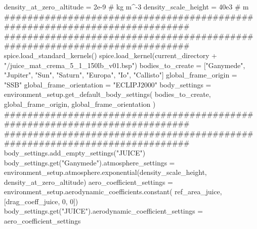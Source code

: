 {}
\markdownRendererSectionEnd \markdownRendererSectionBegin
{}\markdownRendererInterblockSeparator
{}density_at_zero_altitude = 2e-9 # kg m^-3 density_scale_height = 40e3 # m\markdownRendererInterblockSeparator
{}###########################################################################\markdownRendererInterblockSeparator
{}
\markdownRendererSectionEnd \markdownRendererSectionBegin
{}\markdownRendererInterblockSeparator
{}###########################################################################\markdownRendererInterblockSeparator
{}
\markdownRendererSectionEnd \markdownRendererSectionBegin
{}\markdownRendererInterblockSeparator
{}spice.load_standard_kernels() spice.load_kernel(current_directory + "/juice_mat_crema_5_1_150lb_v01.bsp")\markdownRendererInterblockSeparator
{}
\markdownRendererSectionEnd \markdownRendererSectionBegin
{}\markdownRendererInterblockSeparator
{}bodies_to_create = ["Ganymede", "Jupiter", "Sun", "Saturn", "Europa", "Io", "Callisto"] global_frame_origin = "SSB" global_frame_orientation = "ECLIPJ2000" body_settings = environment_setup.get_default_body_settings( bodies_to_create, global_frame_origin, global_frame_orientation )\markdownRendererInterblockSeparator
{}###########################################################################\markdownRendererInterblockSeparator
{}
\markdownRendererSectionEnd \markdownRendererSectionBegin
{}\markdownRendererInterblockSeparator
{}########################################################################### body_settings.add_empty_settings("JUICE")\markdownRendererInterblockSeparator
{}
\markdownRendererSectionEnd \markdownRendererSectionBegin
{}\markdownRendererInterblockSeparator
{}body_settings.get("Ganymede").atmosphere_settings = environment_setup.atmosphere.exponential(density_scale_height, density_at_zero_altitude) aero_coefficient_settings = environment_setup.aerodynamic_coefficients.constant( ref_area_juice, [drag_coeff_juice, 0, 0])\markdownRendererInterblockSeparator
{}
\markdownRendererSectionEnd \markdownRendererSectionBegin
{}\markdownRendererInterblockSeparator
{}body_settings.get("JUICE").aerodynamic_coefficient_settings = aero_coefficient_settings\markdownRendererInterblockSeparator
